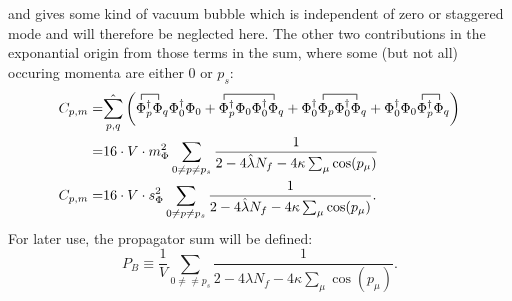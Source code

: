 and gives some kind of vacuum bubble which is independent of zero or staggered mode 
and will therefore be neglected here.
The other two contributions in the exponantial origin from those terms in the sum, where some (but not all) occuring momenta are either $0$ or $p_s$:
\begin{align}\label{eq:CEP_firstOrderLambda_zeroModeContribution}
 C_{p,m}=& \hat{\sum\limits_{p,q}} \left( 
             \contraction{}{\Phi}{{}_p^{\dagger}}{\Phi} \Phi_p^{\dagger}     \Phi_q \Phi_0^{\dagger} \Phi_0
           + \contraction{}{\Phi}{{}_p^{\dagger} \Phi_0 \Phi_0^{\dagger}}{\Phi}      \Phi_p^{\dagger} \Phi_0 \Phi_0^{\dagger} \Phi_q
           + \contraction{\Phi_0^{\dagger} }{\Phi}{{}_p \Phi_0^{\dagger} }{\Phi}      \Phi_0^{\dagger} \Phi_p \Phi_0^{\dagger} \Phi_q
           + \contraction{\Phi_0^{\dagger} \Phi_0 }{\Phi}{{}_p^{\dagger}}{\Phi}      \Phi_0^{\dagger} \Phi_0 \Phi_p^{\dagger} \Phi_q
            \right) \nonumber \\
        =& 16 \cdot V \cdot m_{\Phi}^2 \sum\limits_{0\neq p \neq p_s} \frac{1}{2 - 4 \hat\lambda N_f - 4 \kappa \sum_{\mu} \cos(p_{\mu})} \\
  \label{eq:CEP_firstOrderLambda_staggeredModeContribution}
 C_{p,m}=& 16 \cdot V \cdot s_{\Phi}^2 \sum\limits_{0\neq p \neq p_s} \frac{1}{2 - 4 \hat\lambda N_f - 4 \kappa \sum_{\mu} \cos(p_{\mu})}.
\end{align}
For later use, the propagator sum will be defined:
\begin{equation}\label{eq:bosonicPropagatorSum_CEP}
 P_B \equiv \frac{1}{V}\sum\limits_{0\neq \neq p_s} \frac{1}{2 - 4 \hat\lambda N_f - 4 \kappa \sum_{\mu} \cos(p_{\mu})}.
\end{equation}

